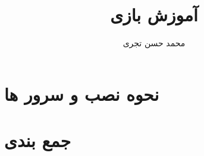 \documentclass{report}
\title{{\Huge آموزش بازی \lr{dungeon crawl stone soup}}}
\author{{\LARGE محمد حسن تجری}}
\date{{\LARGE}}
\begin{document}
\maketitle

\begin{persian}

  \tableofcontents

  

  \chapter*{نحوه نصب و سرور ها}

  

  

  

  

  

  

  

  

  

  

  

  
  
  \chapter*{جمع بندی}

\end{persian}
\end{document}
